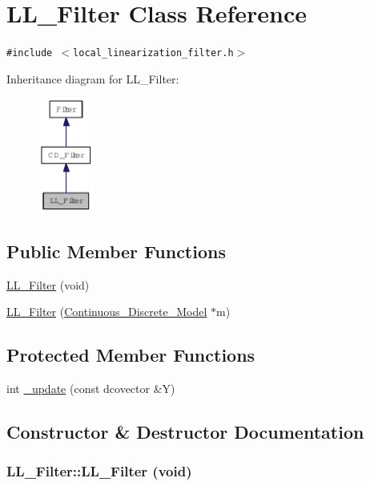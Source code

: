\hypertarget{class_l_l___filter}{
\section{LL\_\-Filter Class Reference}
\label{class_l_l___filter}
}
{\tt \#include $<$local\_\-linearization\_\-filter.h$>$}

Inheritance diagram for LL\_\-Filter:\nopagebreak
\begin{figure}[H]
\begin{center}
\leavevmode
\includegraphics[width=52pt]{class_l_l___filter__inherit__graph}
\end{center}
\end{figure}
\subsection*{Public Member Functions}
\begin{CompactItemize}
\item 
\hyperlink{class_l_l___filter_b8180cc8e1c5e0c1199acced77b3609f}{LL\_\-Filter} (void)
\item 
\hyperlink{class_l_l___filter_a05b72bc41b502dea8abcafc7ff95384}{LL\_\-Filter} (\hyperlink{class_continuous___discrete___model}{Continuous\_\-Discrete\_\-Model} $\ast$m)
\end{CompactItemize}
\subsection*{Protected Member Functions}
\begin{CompactItemize}
\item 
int \hyperlink{class_l_l___filter_ab2b4b545d401d54c66f63a41fa1a99d}{\_\-update} (const dcovector \&Y)
\end{CompactItemize}


\subsection{Constructor \& Destructor Documentation}
\hypertarget{class_l_l___filter_b8180cc8e1c5e0c1199acced77b3609f}{
\subsubsection[{LL\_\-Filter}]{\setlength{\rightskip}{0pt plus 5cm}LL\_\-Filter::LL\_\-Filter (void)}}
\label{class_l_l___filter_b8180cc8e1c5e0c1199acced77b3609f}


